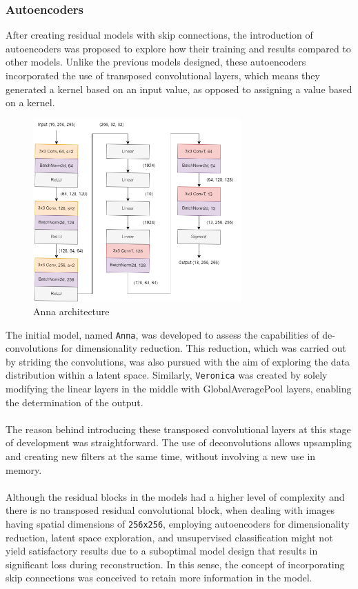 \subsubsection{Autoencoders}
After creating residual models with skip connections, the introduction of autoencoders was proposed to explore how their training and results compared to other models. Unlike the previous models designed, these autoencoders incorporated the use of transposed convolutional layers, which means they generated a kernel based on an input value, as opposed to assigning a value based on a kernel.
\begin{figure}[H]
	\centering
	\includegraphics[width=8cm]{imgs/models/models/cnn/Anna.png}
	\caption{Anna architecture }
	\label{fig:residual-anna}
\end{figure}
The initial model, named \texttt{Anna}, was developed to assess the capabilities of de-convolutions for dimensionality reduction. This reduction, which was carried out by striding the convolutions, was also pursued with the aim of exploring the data distribution within a latent space. Similarly, \texttt{Veronica} was created by solely modifying the linear layers in the middle with GlobalAveragePool layers, enabling the determination of the output.
\\
\\The reason behind introducing these transposed convolutional layers at this stage of development was straightforward. The use of deconvolutions allows upsampling and creating new filters at the same time, without involving a new use in memory.
\\
\\
Although the residual blocks in the models had a higher level of complexity and there is no transposed residual convolutional block, when dealing with images having spatial dimensions of \texttt{256x256}, employing autoencoders for dimensionality reduction, latent space exploration, and unsupervised classification might not yield satisfactory results due to a suboptimal model design that results in significant loss during reconstruction. In this sense, the concept of incorporating skip connections was conceived to retain more information in the model.
